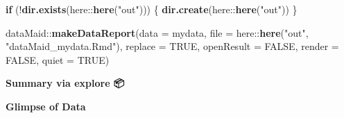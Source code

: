 \documentclass[
]{article}
\newenvironment{Shaded}{\begin{snugshade}}{\end{snugshade}}
\newcommand{\ControlFlowTok}[1]{\textcolor[rgb]{0.12,0.11,0.11}{\textbf{#1}}}
\newcommand{\DataTypeTok}[1]{\textcolor[rgb]{0.00,0.34,0.68}{#1}}
\newcommand{\KeywordTok}[1]{\textcolor[rgb]{0.12,0.11,0.11}{\textbf{#1}}}
\newcommand{\NormalTok}[1]{\textcolor[rgb]{0.12,0.11,0.11}{#1}}
\newcommand{\OperatorTok}[1]{\textcolor[rgb]{0.12,0.11,0.11}{#1}}
\newcommand{\OtherTok}[1]{\textcolor[rgb]{0.00,0.43,0.16}{#1}}
\newcommand{\StringTok}[1]{\textcolor[rgb]{0.75,0.01,0.01}{#1}}
\begin{document}
\begin{Shaded}
\begin{Highlighting}[]
\ControlFlowTok{if}\NormalTok{ (}\OperatorTok{!}\KeywordTok{dir.exists}\NormalTok{(here}\OperatorTok{::}\KeywordTok{here}\NormalTok{(}\StringTok{"out"}\NormalTok{))) \{}
    \KeywordTok{dir.create}\NormalTok{(here}\OperatorTok{::}\KeywordTok{here}\NormalTok{(}\StringTok{"out"}\NormalTok{))}
\NormalTok{\}}

\NormalTok{dataMaid}\OperatorTok{::}\KeywordTok{makeDataReport}\NormalTok{(}\DataTypeTok{data =}\NormalTok{ mydata, }\DataTypeTok{file =}\NormalTok{ here}\OperatorTok{::}\KeywordTok{here}\NormalTok{(}\StringTok{"out"}\NormalTok{, }\StringTok{"dataMaid_mydata.Rmd"}\NormalTok{), }
    \DataTypeTok{replace =} \OtherTok{TRUE}\NormalTok{, }\DataTypeTok{openResult =} \OtherTok{FALSE}\NormalTok{, }\DataTypeTok{render =} \OtherTok{FALSE}\NormalTok{, }\DataTypeTok{quiet =} \OtherTok{TRUE}\NormalTok{)}
\end{Highlighting}
\end{Shaded}

\textbf{Summary via explore 📦}

\begin{Shaded}
\end{Shaded}

\textbf{Glimpse of Data}

\begin{Shaded}
\end{Shaded}
\end{document}
